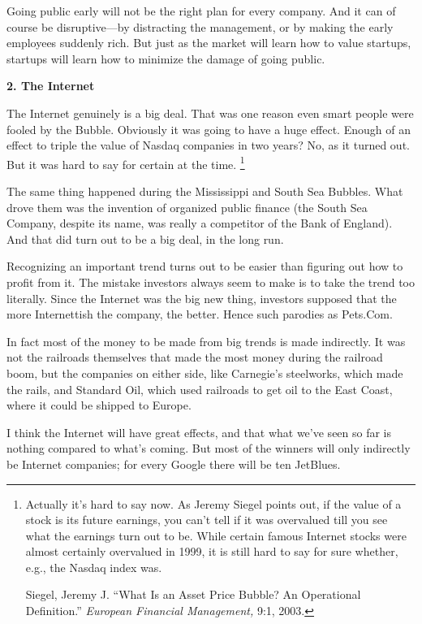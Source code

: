\documentclass[12pt]{book}
\begin{document}
Going public early will not be the right plan for every company. And it
can of course be disruptive---by distracting the management, or by
making the early employees suddenly rich. But just as the market will
learn how to value startups, startups will learn how to minimize the
damage of going public.

\textbf{2. The Internet}

The Internet genuinely is a big deal. That was one reason even smart
people were fooled by the Bubble. Obviously it was going to have a huge
effect. Enough of an effect to triple the value of Nasdaq companies in
two years? No, as it turned out. But it was hard to say for certain at
the time. \footnote{Actually it's hard to say now. As Jeremy Siegel points out, if
the value of a stock is its future earnings, you can't tell if it was
overvalued till you see what the earnings turn out to be. While certain
famous Internet stocks were almost certainly overvalued in 1999, it is
still hard to say for sure whether, e.g., the Nasdaq index was.

Siegel, Jeremy J. ``What Is an Asset Price Bubble? An Operational
Definition.'' \emph{European Financial Management,} 9:1, 2003.}

The same thing happened during the Mississippi and South Sea Bubbles.
What drove them was the invention of organized public finance (the South
Sea Company, despite its name, was really a competitor of the Bank of
England). And that did turn out to be a big deal, in the long run.

Recognizing an important trend turns out to be easier than figuring out
how to profit from it. The mistake investors always seem to make is to
take the trend too literally. Since the Internet was the big new thing,
investors supposed that the more Internettish the company, the better.
Hence such parodies as Pets.Com.

In fact most of the money to be made from big trends is made indirectly.
It was not the railroads themselves that made the most money during the
railroad boom, but the companies on either side, like Carnegie's
steelworks, which made the rails, and Standard Oil, which used railroads
to get oil to the East Coast, where it could be shipped to Europe.

I think the Internet will have great effects, and that what we've seen
so far is nothing compared to what's coming. But most of the winners
will only indirectly be Internet companies; for every Google there will
be ten JetBlues.
\end{document}
